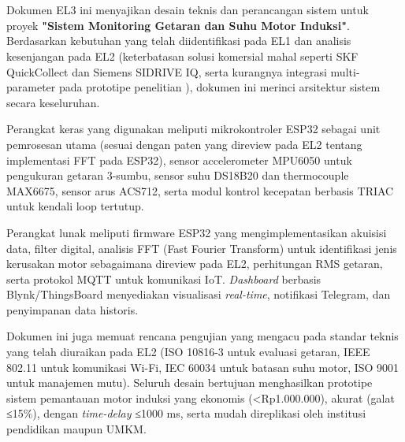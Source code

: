 \documentclass{elsinta}
\begin{document}
\coverpage
\newpage


\tableofcontents
\newpage

\section*{\docsumary}

Dokumen EL3 ini menyajikan desain teknis dan perancangan sistem untuk proyek \textbf{"Sistem Monitoring Getaran dan Suhu Motor Induksi"}. Berdasarkan kebutuhan yang telah diidentifikasi pada EL1 dan analisis kesenjangan pada EL2 (keterbatasan solusi komersial mahal seperti SKF QuickCollect \cite{skf_cmdt392} dan Siemens SIDRIVE IQ, serta kurangnya integrasi multi-parameter pada prototipe penelitian \cite{sonowal2019}), dokumen ini merinci arsitektur sistem secara keseluruhan.

Perangkat keras yang digunakan meliputi mikrokontroler ESP32 sebagai unit pemrosesan utama (sesuai dengan paten yang direview pada EL2 tentang implementasi FFT pada ESP32), sensor accelerometer MPU6050 untuk pengukuran getaran 3-sumbu, sensor suhu DS18B20 dan thermocouple MAX6675, sensor arus ACS712, serta modul kontrol kecepatan berbasis TRIAC untuk kendali loop tertutup.

Perangkat lunak meliputi firmware ESP32 yang mengimplementasikan akuisisi data, filter digital, analisis FFT (Fast Fourier Transform) untuk identifikasi jenis kerusakan motor sebagaimana direview pada EL2, perhitungan RMS getaran, serta protokol MQTT untuk komunikasi IoT. \textit{Dashboard} berbasis Blynk/ThingsBoard menyediakan visualisasi \textit{real-time}, notifikasi Telegram, dan penyimpanan data historis.

Dokumen ini juga memuat rencana pengujian yang mengacu pada standar teknis yang telah diuraikan pada EL2 (ISO 10816-3 untuk evaluasi getaran, IEEE 802.11 untuk komunikasi Wi-Fi, IEC 60034 untuk batasan suhu motor, ISO 9001 untuk manajemen mutu). Seluruh desain bertujuan menghasilkan prototipe sistem pemantauan motor induksi yang ekonomis (<Rp1.000.000), akurat (galat ≤15\%), dengan \textit{time-delay} ≤1000 ms, serta mudah direplikasi oleh institusi pendidikan maupun UMKM.

\newpage

\end{document}
